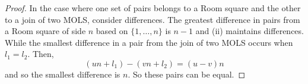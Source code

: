 \begin{proof}
In the case where one set of pairs belongs to a Room square and the other to a join of two MOLS, consider differences.
The greatest difference in pairs from a Room square of side $n$ based on $\{1, \ldots, n\}$ is $n - 1$ and (ii) maintains differences.
While the smallest difference in a pair from the join of two MOLS occurs when $l_1 = l_2$.
Then,
\begin{equation}
  (un + l_1) - (vn + l_2) = (u - v)n
\end{equation}
and so the smallest difference is $n$.
So these pairs can be equal.
\end{proof}

